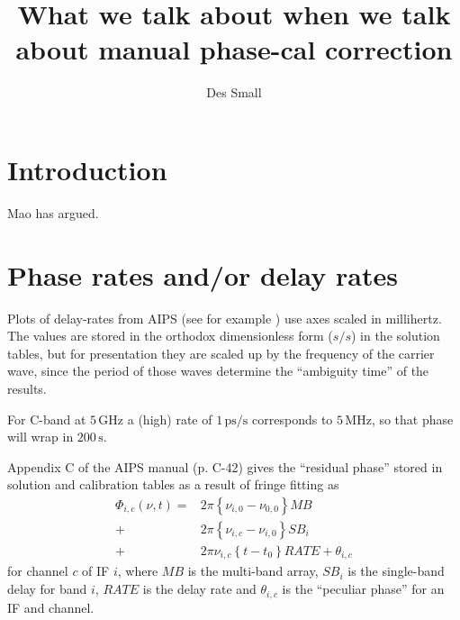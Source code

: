 \documentclass[11pt, twoside, a4paper]{article}
\author[1]{Des Small}
\affil[1]{JIVE}
\title{What we talk about when we talk about manual phase-cal correction}
\begin{document}
\sloppy
\usetikzlibrary{decorations.pathmorphing}
\maketitle
\lstset{basicstyle=\ttfamily\footnotesize,breaklines=true}

\section{Introduction}

Mao\cite{mao15} has argued. \cite{diamond}

\section{Phase rates and/or delay rates}
Plots of delay-rates from AIPS (see for example \cite{mao15}) use axes
scaled in millihertz. The values are stored in the orthodox
dimensionless form ($s/s$) in the solution tables, but for presentation
they are scaled up by the frequency of the carrier wave, since the
period of those waves determine the ``ambiguity time'' of the results.

For C-band at $5\,\mathrm{GHz}$ a (high) rate of
$1\,\mathrm{ps}/\mathrm{s}$ corresponds to $5\,\mathrm{MHz}$, so that
phase will wrap in $200\,\mathrm{s}$.

Appendix C of the AIPS manual (p. C-42) gives the ``residual phase''
stored in solution and calibration tables as a result of fringe fitting
as
\begin{equation}
  \begin{split}
    \Phi_{i,c}(\nu, t) = &2\pi\left\{\nu_{i,0} - \nu_{0,0}\right\} \mathit{MB} \\
    + &2\pi\left\{\nu_{i,c} - \nu_{i,0}\right\} \mathit{SB}_i \\
    + &2\pi \nu_{i,c} \left\{t-t_0\right\} \mathit{RATE} + \theta_{i,c} 
  \end{split}
\end{equation}
for channel $c$ of IF $i$, where $\mathit{MB}$ is the multi-band array, $\mathit{SB}_i$ is
the single-band delay for band $i$, $\mathit{RATE}$ is the delay rate
and $\theta_{i,c}$ is the ``peculiar phase'' for an IF and channel.
\end{document}
